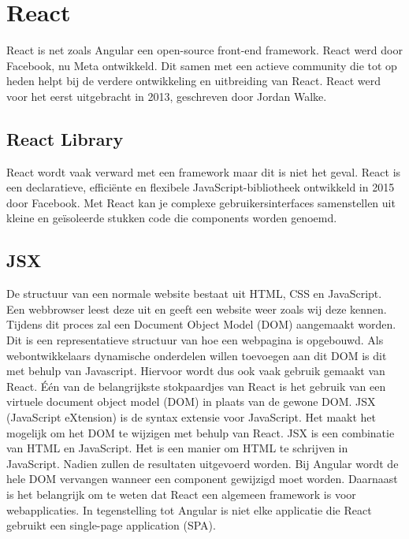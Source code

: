 \section*{React}%
React is net zoals Angular een open-source \textcite{React2024} front-end
framework. React werd door Facebook, nu Meta ontwikkeld. Dit samen met een
actieve community die tot op heden helpt bij de verdere ontwikkeling en
uitbreiding van React. React werd voor het eerst uitgebracht in 2013,
geschreven door Jordan Walke.

\subsection*{React Library}%
React wordt vaak verward met een framework maar dit is niet het geval. \autocite{Boloorchi2017} React is een declaratieve, efficiënte en flexibele JavaScript-bibliotheek ontwikkeld in 2015 door Facebook. Met React kan je complexe ge\-bruik\-er\-sin\-ter\-fa\-ces samen\-stellen uit kleine en ge\-ïso\-leerde stuk\-ken code die comp\-onents worden genoemd.

\subsection*{JSX}
De structuur van een normale website bestaat uit HTML, CSS en JavaScript. Een
webbrowser leest deze uit en geeft een website weer zoals wij deze kennen.
Tijdens dit proces zal een Document Object Model (DOM) aangemaakt worden. Dit is
een representatieve structuur van hoe een webpagina is opgebouwd. Als
webontwikkelaars dynamische onderdelen willen toevoegen aan dit DOM is dit met behulp van
Javascript. Hiervoor wordt dus ook vaak gebruik gemaakt van React. Één van de belangrijkste stokpaardjes van React is het gebruik van een virtuele document object model (DOM) in plaats van de gewone DOM. JSX (JavaScript eXtension) is de syntax extensie voor JavaScript. Het maakt het mogelijk om het DOM te wijzigen met behulp van React. JSX is een combinatie van HTML en JavaScript. Het is een manier om HTML te schrijven in JavaScript. Nadien zullen de resultaten uitgevoerd worden. Bij Angular wordt de hele DOM vervangen wanneer een component gewijzigd moet worden. Daarnaast is het belangrijk om te weten dat React een algemeen framework is voor webapplicaties. In tegenstelling tot Angular is niet elke applicatie die React gebruikt een single-page application (SPA).


